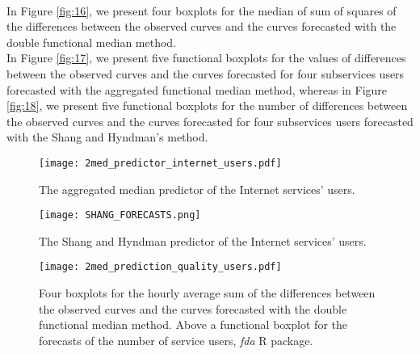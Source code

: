 \documentclass[12pt,a4paper]{article}
\numberwithin{equation}{section}
\begin{document}
\\ In Figure \ref{fig:16}, we present four boxplots for the median of sum of squares of the differences between the observed curves and the curves forecasted with the double functional median method.
\\ In Figure \ref{fig:17}, we present five functional boxplots for the values of differences between the observed curves and the curves forecasted for four subservices users forecasted  with the aggregated functional median method, whereas in Figure \ref{fig:18}, we present five functional boxplots for the  number of differences between the observed curves and the curves forecasted for four subservices users forecasted  with the Shang and Hyndman's method.

\begin{figure*}
\texttt{[image: 2med\_predictor\_internet\_users.pdf]}
\caption{The aggregated median predictor of the Internet services' users.}
\label{fig:13}
\end{figure*}
\begin{figure*}
\texttt{[image: SHANG\_FORECASTS.png]}
\caption{The Shang and Hyndman predictor of the Internet services' users.}
\label{fig:14}
\end{figure*}
\begin{figure*}
\texttt{[image: 2med\_prediction\_quality\_users.pdf]}
\caption{
Four boxplots for the hourly average sum of the differences between the observed curves and the curves forecasted with the double functional median method. Above a functional boxplot for the forecasts of the number of service users, \textit{fda} R package.}
\label{fig:15}
\end{figure*}
\end{document}
